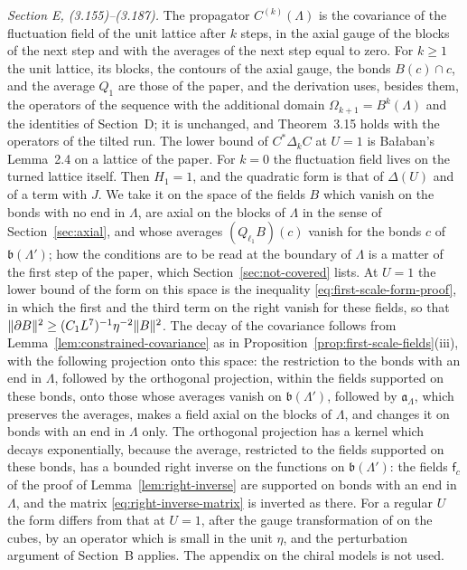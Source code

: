 \documentclass[11pt]{preprint}
\DeclarePairedDelimiter{\norm}{\lVert}{\rVert}
\numberwithin{equation}{section}
\theoremstyle{definition}
\theoremstyle{remark}
\theoremstyle{plain}
\begin{document}
\emph{Section E, (3.155)--(3.187).} The propagator $C^{(k)}(\Lambda)$ is the covariance of the fluctuation field of the unit lattice after $k$ steps, in the axial gauge of the blocks of the next step and with the averages of the next step equal to zero. For $k \geq 1$ the unit lattice, its blocks, the contours of the axial gauge, the bonds $B(c) \cap c$, and the average $Q_1$ are those of the paper, and the derivation \cite[(3.155)--(3.186)]{BalabanPBG} uses, besides them, the operators of the sequence with the additional domain $\Omega_{k+1} = B^k(\Lambda)$ and the identities of Section~D; it is unchanged, and Theorem~3.15 holds with the operators of the tilted run. The lower bound of $C^*\Delta_kC$ at $U = 1$ is Ba{\l}aban's Lemma~2.4 on a lattice of the paper. For $k = 0$ the fluctuation field lives on the turned lattice itself. Then $H_1 = 1$, and the quadratic form \cite[(3.156)]{BalabanPBG} is that of $\Delta(U)$ and of a term with $J$. We take it on the space of the fields $B$ which vanish on the bonds with no end in $\Lambda$, are axial on the blocks of $\Lambda$ in the sense of Section~\ref{sec:axial}, and whose averages $(Q_{\ell_1}B)(c)$ vanish for the bonds $c$ of $\mathfrak b(\Lambda')$; how the conditions are to be read at the boundary of $\Lambda$ is a matter of the first step of the paper, which Section~\ref{sec:not-covered} lists. At $U = 1$ the lower bound of the form on this space is the inequality \eqref{eq:first-scale-form-proof}, in which the first and the third term on the right vanish for these fields, so that $\norm{\partial B}^2 \geq (C_1L^7)^{-1}\eta^{-2}\norm B^2$. The decay of the covariance follows from Lemma~\ref{lem:constrained-covariance} as in Proposition~\ref{prop:first-scale-fields}(iii), with the following projection onto this space: the restriction to the bonds with an end in $\Lambda$, followed by the orthogonal projection, within the fields supported on these bonds, onto those whose averages vanish on $\mathfrak b(\Lambda')$, followed by $\mathfrak a_\Lambda$, which preserves the averages, makes a field axial on the blocks of $\Lambda$, and changes it on bonds with an end in $\Lambda$ only. The orthogonal projection has a kernel which decays exponentially, because the average, restricted to the fields supported on these bonds, has a bounded right inverse on the functions on $\mathfrak b(\Lambda')$: the fields $\mathsf f_c$ of the proof of Lemma~\ref{lem:right-inverse} are supported on bonds with an end in $\Lambda$, and the matrix \eqref{eq:right-inverse-matrix} is inverted as there. For a regular $U$ the form differs from that at $U = 1$, after the gauge transformation of \cite[(3.35)]{BalabanPBG} on the cubes, by an operator which is small in the unit $\eta$, and the perturbation argument of Section~B applies. The appendix on the chiral models is not used.
\end{document}
